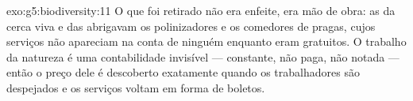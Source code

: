 \begin{solution}{exo:g5:biodiversity:11}
O que foi retirado não era enfeite, era mão de obra: as  da
cerca viva e das  abrigavam os polinizadores e os comedores de
pragas, cujos serviços não apareciam na conta de ninguém enquanto
eram gratuitos. O trabalho da natureza é uma contabilidade invisível
--- constante, não paga, não notada --- então o preço dele é
descoberto exatamente quando os trabalhadores são despejados e os
serviços voltam em forma de boletos.
\end{solution}
